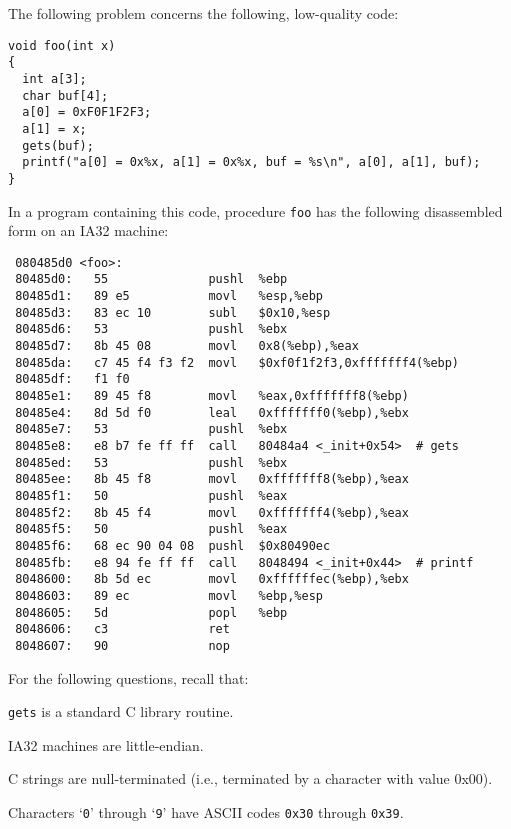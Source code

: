 The following problem concerns the following, low-quality code:
\small{\begin{verbatim}
void foo(int x)
{
  int a[3];
  char buf[4];
  a[0] = 0xF0F1F2F3;
  a[1] = x;
  gets(buf);
  printf("a[0] = 0x%x, a[1] = 0x%x, buf = %s\n", a[0], a[1], buf);
}
\end{verbatim}}

In a program containing
this code, procedure {\tt foo} has the following disassembled form
on an IA32 machine:

\small{\begin{verbatim}
 080485d0 <foo>:
 80485d0:	55             	pushl  %ebp
 80485d1:	89 e5          	movl   %esp,%ebp
 80485d3:	83 ec 10       	subl   $0x10,%esp
 80485d6:	53             	pushl  %ebx
 80485d7:	8b 45 08       	movl   0x8(%ebp),%eax
 80485da:	c7 45 f4 f3 f2 	movl   $0xf0f1f2f3,0xfffffff4(%ebp)
 80485df:	f1 f0 
 80485e1:	89 45 f8       	movl   %eax,0xfffffff8(%ebp)
 80485e4:	8d 5d f0       	leal   0xfffffff0(%ebp),%ebx
 80485e7:	53             	pushl  %ebx
 80485e8:	e8 b7 fe ff ff 	call   80484a4 <_init+0x54>  # gets
 80485ed:	53             	pushl  %ebx
 80485ee:	8b 45 f8       	movl   0xfffffff8(%ebp),%eax
 80485f1:	50             	pushl  %eax
 80485f2:	8b 45 f4       	movl   0xfffffff4(%ebp),%eax
 80485f5:	50             	pushl  %eax
 80485f6:	68 ec 90 04 08 	pushl  $0x80490ec
 80485fb:	e8 94 fe ff ff 	call   8048494 <_init+0x44>  # printf
 8048600:	8b 5d ec       	movl   0xffffffec(%ebp),%ebx
 8048603:	89 ec          	movl   %ebp,%esp
 8048605:	5d             	popl   %ebp
 8048606:	c3             	ret    
 8048607:	90             	nop    
\end{verbatim}}

For the following questions, recall that:
\begin{denseitemize}
\item {\tt gets} is a standard C library routine. 
\item IA32 machines are little-endian.
\item C strings are null-terminated 
(i.e., terminated by a character with value 0x00). 
\item Characters `{\tt 0}' through `{\tt 9}' have ASCII codes
{\tt 0x30} through {\tt 0x39}.
\end{denseitemize}

\newpage

